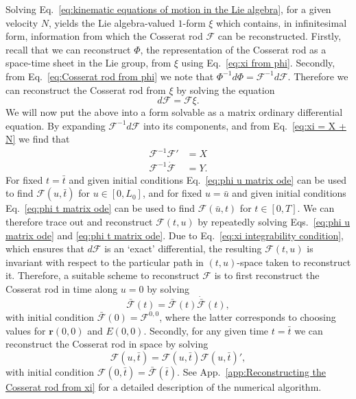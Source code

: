Solving Eq.~\ref{eq:kinematic equations of motion in the Lie algebra}, for a given velocity $N$, yields the Lie algebra-valued $1$-form $\xi$ which contains, in infinitesimal form, information from which the Cosserat rod $\mathcal{F}$ can be reconstructed. Firstly, recall that we can reconstruct $\Phi$, the representation of the Cosserat rod as a space-time sheet in the Lie group, from $\xi$ using Eq.~\ref{eq:xi from phi}. Secondly, from Eq.~\ref{eq:Cosserat rod from phi} we note that $\Phi^{-1} d \Phi = \mathcal{F}^{-1} d \mathcal{F}$. Therefore we can reconstruct the Cosserat rod from $\xi$ by solving the equation
\begin{equation}
d \mathcal{F} = \mathcal{F} \xi.
\end{equation}
We will now put the above into a form solvable as a matrix ordinary differential equation. By expanding $\mathcal{F}^{-1} d \mathcal{F}$ into its components, and from Eq.~\ref{eq:xi = X + N} we find that
\begin{subequations} \label{eq:reconstruction of F eqs}
\begin{align}
\mathcal{F}^{-1} \mathcal{F}' & = X \label{eq:phi u matrix ode} \\
\mathcal{F}^{-1} \dot{\mathcal{F}} & = Y. \label{eq:phi t matrix ode}
\end{align}
\end{subequations}
For fixed $t = \bar{t}$ and given initial conditions Eq.~\ref{eq:phi u matrix ode} can be used to find $\mathcal{F}(u,\bar{t})$ for $u \in [0, L_0]$, and for fixed $u = \bar{u}$ and given initial conditions Eq.~\ref{eq:phi t matrix ode} can be used to find $\mathcal{F}(\bar{u}, t)$ for $t \in [0, T]$. We can therefore trace out and reconstruct $\mathcal{F}(t,u)$ by repeatedly solving Eqs.~\ref{eq:phi u matrix ode} and \ref{eq:phi t matrix ode}. Due to Eq.~\ref{eq:xi integrability condition}, which ensures that $d \mathcal{F}$ is an `exact' differential, the resulting $\mathcal{F}(t,u)$ is invariant with respect to the particular path in $(t,u)$-space taken to reconstruct it. Therefore, a suitable scheme to reconstruct $\mathcal{F}$ is to first reconstruct the Cosserat rod in time along $u=0$ by solving
\begin{equation} \label{eq:1st step reconstruction}
\bar{\mathcal{F}}(t) = \bar{\mathcal{F}}(t) \dot{\bar{\mathcal{F}}}(t),
\end{equation}
with initial condition $\bar{\mathcal{F}}(0) = \mathcal{F}^{0,0}$, where the latter corresponds to choosing values for $\mathbf{r}(0,0)$ and $E(0,0)$. Secondly, for any given time $t = \bar{t}$ we can reconstruct the Cosserat rod in space by solving
\begin{equation}
\mathcal{F}(u,\bar{t}) = \mathcal{F}(u, \bar{t}) \mathcal{F}(u, \bar{t})',
\end{equation}
with initial condition $\mathcal{F}(0, \bar{t}) = \bar{\mathcal{F}}(\bar{t})$. See App.~\ref{app:Reconstructing the Cosserat rod from xi} for a detailed description of the numerical algorithm.

